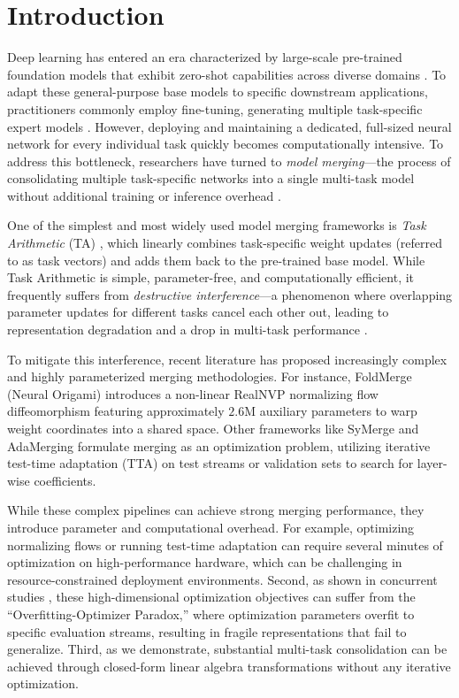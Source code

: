 \section{Introduction}
\label{sec:intro}

Deep learning has entered an era characterized by large-scale pre-trained foundation models that exhibit zero-shot capabilities across diverse domains \cite{radford2021learning, devlin2018bert, vaswani2017attention}. To adapt these general-purpose base models to specific downstream applications, practitioners commonly employ fine-tuning, generating multiple task-specific expert models \cite{wortsman2022robust}. However, deploying and maintaining a dedicated, full-sized neural network for every individual task quickly becomes computationally intensive. To address this bottleneck, researchers have turned to \emph{model merging}—the process of consolidating multiple task-specific networks into a single multi-task model without additional training or inference overhead \cite{fedavg, wortsman2022model, ainsworth2022git}.

One of the simplest and most widely used model merging frameworks is \emph{Task Arithmetic} (TA) \cite{ilharco2022editing}, which linearly combines task-specific weight updates (referred to as task vectors) and adds them back to the pre-trained base model. While Task Arithmetic is simple, parameter-free, and computationally efficient, it frequently suffers from \emph{destructive interference}—a phenomenon where overlapping parameter updates for different tasks cancel each other out, leading to representation degradation and a drop in multi-task performance \cite{yadav2023ties, yu2023dare}.

To mitigate this interference, recent literature has proposed increasingly complex and highly parameterized merging methodologies. For instance, FoldMerge (Neural Origami) \cite{foldmerge2025} introduces a non-linear RealNVP normalizing flow diffeomorphism featuring approximately $2.6\text{M}$ auxiliary parameters to warp weight coordinates into a shared space. Other frameworks like SyMerge \cite{symerge2025} and AdaMerging \cite{yang2023adamerging} formulate merging as an optimization problem, utilizing iterative test-time adaptation (TTA) on test streams or validation sets to search for layer-wise coefficients. 

While these complex pipelines can achieve strong merging performance, they introduce parameter and computational overhead. For example, optimizing normalizing flows or running test-time adaptation can require several minutes of optimization on high-performance hardware, which can be challenging in resource-constrained deployment environments. Second, as shown in concurrent studies \cite{saim2025}, these high-dimensional optimization objectives can suffer from the ``Overfitting-Optimizer Paradox,'' where optimization parameters overfit to specific evaluation streams, resulting in fragile representations that fail to generalize. Third, as we demonstrate, substantial multi-task consolidation can be achieved through closed-form linear algebra transformations without any iterative optimization.

